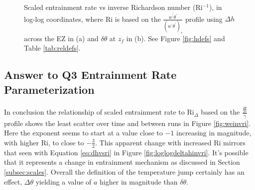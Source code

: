 \begin{figure}[htbp]
\begin{minipage}[b]{0.5\linewidth}
        \\
        \end{minipage}             
\quad
\begin{minipage}[b]{0.5\linewidth}
        \\
       
       \end{minipage}
        \caption[Scaled entrainment rate vs inverse Richardson number (ii)]{Scaled entrainment rate vs inverse Richardson number (\acs{Ri}$^{-1}$), in log-log coordinates, where \acs{Ri} is based on the $\frac{\overline{w^{'}\theta^{'}}}{(\overline{w^{'}\theta^{'}})_{s}}$
profile using $\Delta h$ across the \acs{EZ} in (a) and $\delta \theta$ at $z_{f}$ in (b).  See Figure \ref{fig:hdefs} and Table \ref{tab:reldefs}.}
        \label{fig:weinvri_f}
\end{figure}

\subsection{Answer to Q3 Entrainment Rate Parameterization}
In conclusion the relationship of scaled entrainment rate to \acs{Ri}$_{\Delta}$ based on the $\frac{\frac{\partial \overline{\theta}}{\partial z}}{\gamma}$ profile shows the least scatter over time and between runs in Figure \ref{fig:weinvri}.  Here the exponent seems to start at a value close to $-1$ increasing in magnitude, with higher \acs{Ri}, to close to $-\frac{3}{2}$.  This apparent change with increased \acs{Ri} mirrors that seen with Equation \ref{eq:dhvsri} in Figure \ref{fig:loglogdeltahinvri}.  It's possible that it represents a change in entrainment mechanism as discussed in Section \ref{subsec:scales}.  Overall the definition of the temperature jump certainly has an effect, $\Delta \theta$ yielding a value of $a$ higher in magnitude than $\delta \theta$.

\endinput

Any text after an \endinput is ignored.
You could put scraps here or things in progress.
